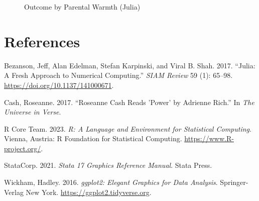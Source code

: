 \documentclass[
  letterpaper,
  DIV=11,
  numbers=noendperiod]{scrreprt}
\newlength{\cslhangindent}
\newenvironment{CSLReferences}[2] %
 {\begin{list}{}{%
  \setlength{\itemindent}{0pt}
  \setlength{\leftmargin}{0pt}
  \setlength{\parsep}{0pt}
  \ifodd #1
   \setlength{\leftmargin}{\cslhangindent}
   \setlength{\itemindent}{-1\cslhangindent}
  \fi
  \setlength{\itemsep}{#2\baselineskip}}}
 {\end{list}}
\begin{document}
\begin{figure}[H]


\caption{\label{fig-Juliaspagplot}Outcome by Parental Warmth (Julia)}

\end{figure}%


\chapter*{References}\label{references}


\label{refs}
\begin{CSLReferences}{1}{0}
Bezanson, Jeff, Alan Edelman, Stefan Karpinski, and Viral B. Shah. 2017.
{``Julia: A Fresh Approach to Numerical Computing.''} \emph{SIAM Review}
59 (1): 65--98. \url{https://doi.org/10.1137/141000671}.

Cash, Roseanne. 2017. {``Roseanne Cash Reads 'Power' by Adrienne
Rich.''} In \emph{The Universe in Verse}.

R Core Team. 2023. \emph{R: A Language and Environment for Statistical
Computing}. Vienna, Austria: R Foundation for Statistical Computing.
\url{https://www.R-project.org/}.

StataCorp. 2021. \emph{Stata 17 Graphics Reference Manual}. Stata Press.

Wickham, Hadley. 2016. \emph{{ggplot2}: Elegant Graphics for Data
Analysis}. Springer-Verlag New York.
\url{https://ggplot2.tidyverse.org}.

\end{CSLReferences}
\end{document}
